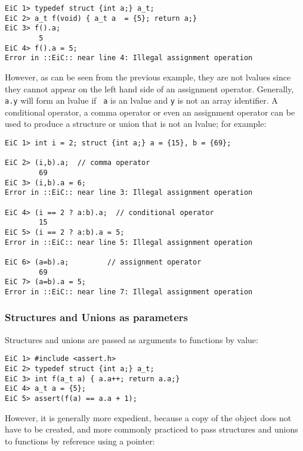 \begin{production}
\begin{verbatim}
EiC 1> typedef struct {int a;} a_t; 
EiC 2> a_t f(void) { a_t a  = {5}; return a;}
EiC 3> f().a;
        5
EiC 4> f().a = 5;
Error in ::EiC:: near line 4: Illegal assignment operation
\end{verbatim}
\end{production}
 However, as can be seen from the previous example, they are not
lvalues since they cannot appear on the left hand side of an
assignment operator. Generally, {\tt a.y} will form an lvalue if {\tt
a} is an lvalue and {\tt y} is not an array identifier.  A conditional
operator, a comma operator or even an assignment operator can be used
to produce a structure or union that is not an lvalue; for example:

\begin{production}
\begin{verbatim}
EiC 1> int i = 2; struct {int a;} a = {15}, b = {69};

EiC 2> (i,b).a;  // comma operator
        69
EiC 3> (i,b).a = 6; 
Error in ::EiC:: near line 3: Illegal assignment operation

EiC 4> (i == 2 ? a:b).a;  // conditional operator 
        15
EiC 5> (i == 2 ? a:b).a = 5;  
Error in ::EiC:: near line 5: Illegal assignment operation

EiC 6> (a=b).a;         // assignment operator
        69
EiC 7> (a=b).a = 5;          
Error in ::EiC:: near line 7: Illegal assignment operation
\end{verbatim}
\end{production}

\subsubsection{Structures and Unions as parameters}
\label{sec:StructParm}

Structures and unions are passed as arguments to functions by value:
\begin{production}
\begin{verbatim}
EiC 1> #include <assert.h>
EiC 2> typedef struct {int a;} a_t; 
EiC 3> int f(a_t a) { a.a++; return a.a;}
EiC 4> a_t a = {5};
EiC 5> assert(f(a) == a.a + 1);
\end{verbatim}
\end{production}

However, it is generally more expedient, because a copy of the object
does not have to be created, and more commonly practiced to pass
structures and unions to functions by reference using a pointer:

